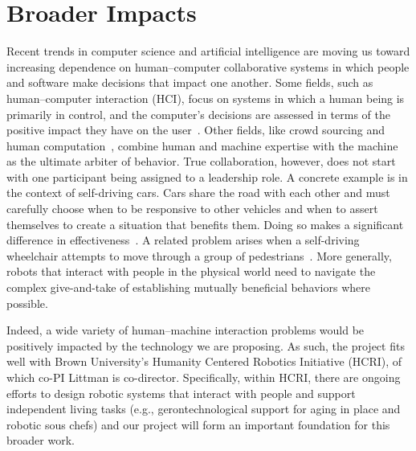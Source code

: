 
\section{Broader Impacts}

Recent trends in computer science and artificial intelligence are
moving us toward increasing dependence on human--computer
collaborative systems in which people and software make decisions that
impact one another.  Some fields, such as human--computer interaction
(HCI), focus on systems in which a human being is primarily in
control, and the computer's decisions are assessed in terms of the
positive impact they have on the user~\cite{maes1993learning}.
Other fields, like crowd sourcing and human
computation~\cite{von2009human}, combine human and machine expertise
with the machine as the ultimate arbiter of behavior.
True collaboration, however, does not start with one participant being
assigned to a leadership role.  
A concrete example
is in the context of self-driving cars.  Cars share the road with each
other and must carefully choose when to be responsive to other
vehicles and when to assert themselves to create a situation that
benefits them.  Doing so makes a significant difference in
effectiveness~\cite{cunningham2015mpdm}.  A related problem
arises when a self-driving wheelchair attempts to move through a group
of pedestrians~\cite{kim2016socially}.  More generally, robots that
interact with people in the physical world need to navigate the
complex give-and-take of establishing mutually beneficial behaviors
where possible.

Indeed, a wide variety of human--machine interaction problems would be
positively impacted by the technology we are proposing.
%
As such, the project fits well with Brown University's Humanity
Centered Robotics Initiative (HCRI), of which co-PI Littman is
co-director.  Specifically, within HCRI, there are ongoing efforts to
design robotic systems that interact with people and support
independent living tasks (e.g., gerontechnological support for aging
in place and robotic sous chefs) and our project will form an
important foundation for this broader work.

